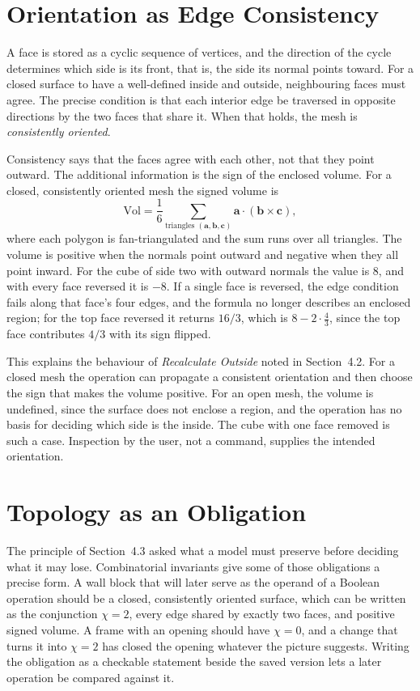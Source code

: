 \section{Orientation as Edge Consistency}

A face is stored as a cyclic sequence of vertices, and the direction of the cycle determines which side is its front, that is, the side its normal points toward. For a closed surface to have a well-defined inside and outside, neighbouring faces must agree. The precise condition is that each interior edge be traversed in opposite directions by the two faces that share it. When that holds, the mesh is \emph{consistently oriented}.

Consistency says that the faces agree with each other, not that they point outward. The additional information is the sign of the enclosed volume. For a closed, consistently oriented mesh the signed volume is
\[
  \mathrm{Vol}=\frac16\sum_{\text{triangles }(\mathbf a,\mathbf b,\mathbf c)}\mathbf a\cdot(\mathbf b\times\mathbf c),
\]
where each polygon is fan-triangulated and the sum runs over all triangles. The volume is positive when the normals point outward and negative when they all point inward. For the cube of side two with outward normals the value is $8$, and with every face reversed it is $-8$. If a single face is reversed, the edge condition fails along that face's four edges, and the formula no longer describes an enclosed region; for the top face reversed it returns $16/3$, which is $8-2\cdot\tfrac43$, since the top face contributes $4/3$ with its sign flipped.

This explains the behaviour of \emph{Recalculate Outside} noted in Section~4.2. For a closed mesh the operation can propagate a consistent orientation and then choose the sign that makes the volume positive. For an open mesh, the volume is undefined, since the surface does not enclose a region, and the operation has no basis for deciding which side is the inside. The cube with one face removed is such a case. Inspection by the user, not a command, supplies the intended orientation.

\section{Topology as an Obligation}

The principle of Section~4.3 asked what a model must preserve before deciding what it may lose. Combinatorial invariants give some of those obligations a precise form. A wall block that will later serve as the operand of a Boolean operation should be a closed, consistently oriented surface, which can be written as the conjunction $\chi=2$, every edge shared by exactly two faces, and positive signed volume. A frame with an opening should have $\chi=0$, and a change that turns it into $\chi=2$ has closed the opening whatever the picture suggests. Writing the obligation as a checkable statement beside the saved version lets a later operation be compared against it.

